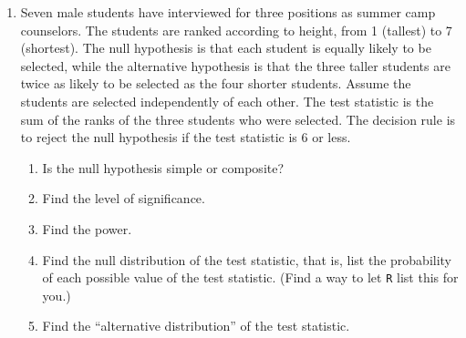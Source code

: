 \documentclass[12pt]{article}
\begin{document}
\begin{enumerate}
\item
    Seven male students have interviewed for three positions
    as summer camp counselors. The students are ranked according to
    height, from 1 (tallest) to 7 (shortest).
    The null hypothesis is that each student is equally likely to be
    selected, while the alternative hypothesis is that the three taller
    students are twice as likely to be selected as the four shorter
    students. Assume the students are selected independently of each
    other. The test statistic is the sum of the ranks of the three
    students who were selected. The decision rule is to reject the null
    hypothesis if the test statistic is 6 or less.
    \begin{enumerate}
    \item
        Is the null hypothesis simple or composite?
    \item
        Find the level of significance.
    \item
        Find the power.
    \item
        Find the null distribution of the test statistic,
        that is, list the probability of each possible value of the test
        statistic.
        (Find a way to let \texttt{R} list this for you.)
    \item
        Find the ``alternative distribution'' of the test statistic.
    \end{enumerate}
\end{enumerate}
\end{document}

